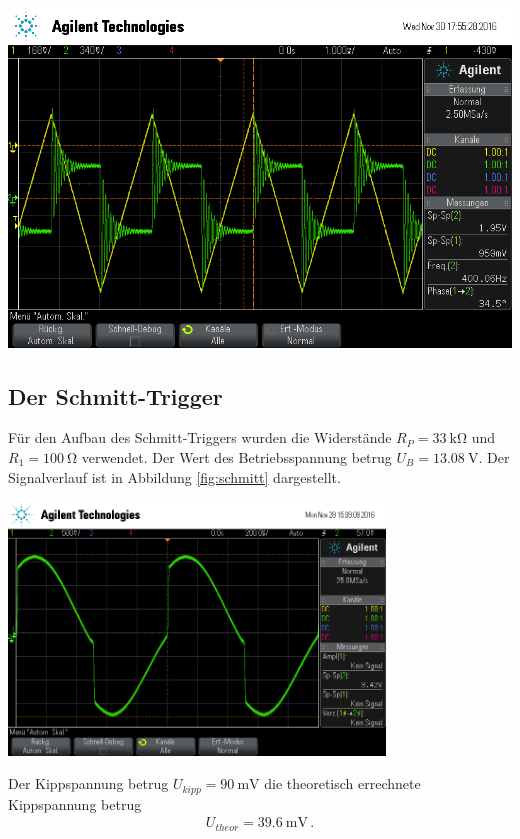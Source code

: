 \documentclass[]{scrartcl}
\begin{document}
\begin{minipage}[t]{0.5\textwidth}
	\includegraphics[width=\textwidth]{images/dreieck_diff}
	\label{fig:dreieckdiff}
\end{minipage} 

\subsection{Der Schmitt-Trigger}
Für den Aufbau des Schmitt-Triggers wurden die Widerstände $R_P=\SI{33}{\kilo\ohm}$ und $R_1=\SI{100}{\ohm}$ verwendet. Der Wert des Betriebsspannung betrug $U_B=\SI{13.08}{\volt}$. Der Signalverlauf ist in Abbildung \ref{fig:schmitt} dargestellt.\\
\begin{center}
	\includegraphics[width=10cm]{images/schmitt.png}
	\label{fig:schmitt}
\end{center}
Der Kippspannung betrug $U_{kipp}=\SI{90}{\milli\volt}$ die theoretisch errechnete Kippspannung betrug
\begin{align*}
U_{theor}=\SI{39.6}{\milli\volt}\,.
\end{align*}
\end{document}
